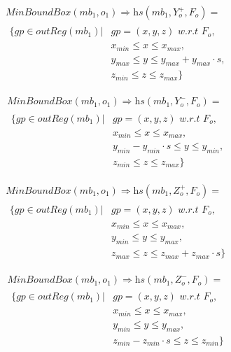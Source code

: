 \documentclass{article}
\begin{document}
\begin{multline}
    \textit{MinBoundBox}(mb_1,o_1) \Rightarrow  \textit{hs}(mb_1,Y_{o}^{+}, F_o) = \\
\begin{split}
    \{gp \in \textit{outReg}(mb_1)| &{} gp=(x,y,z) \textit{ w.r.t } F_o,   \\
   & x_{min} \leq x \leq x_{max} , \\
   &  y_{max}  \leq y \leq y_{max} + y_{max} \cdot s, \\
   &  z_{min} \leq z \leq z_{max}  \} 
   \end{split}
\end{multline}

\begin{multline}
    \textit{MinBoundBox}(mb_1,o_1) \Rightarrow  \textit{hs}(mb_1,Y_{o}^{-}, F_o) = \\
\begin{split}
    \{gp \in \textit{outReg}(mb_1)| &{} gp=(x,y,z) \textit{ w.r.t } F_o,   \\
   & x_{min} \leq x \leq x_{max} , \\
   &  y_{min} -  y_{min} \cdot s \leq y \leq y_{min}, \\
   &  z_{min} \leq z \leq z_{max}  \} 
   \end{split}
\end{multline}

\begin{multline}
    \textit{MinBoundBox}(mb_1,o_1) \Rightarrow  \textit{hs}(mb_1,Z_{o}^{+}, F_o) = \\
\begin{split}
    \{gp \in \textit{outReg}(mb_1)| &{} gp=(x,y,z) \textit{ w.r.t } F_o,   \\
   & x_{min} \leq x \leq x_{max} , \\
   &  y_{min}  \leq y \leq y_{max}, \\
   &  z_{max} \leq z \leq z_{max} + z_{max} \cdot s  \} 
   \end{split}
\end{multline}

\begin{multline}
    \textit{MinBoundBox}(mb_1,o_1) \Rightarrow  \textit{hs}(mb_1,Z_{o}^{-}, F_o) = \\
\begin{split}
    \{gp \in \textit{outReg}(mb_1)| &{} gp=(x,y,z) \textit{ w.r.t } F_o,   \\
   & x_{min} \leq x \leq x_{max} , \\
   &  y_{min}  \leq y \leq y_{max}, \\
   &  z_{min} -  z_{min} \cdot s \leq z \leq z_{min} \} 
   \end{split}
\end{multline}
\end{document}
